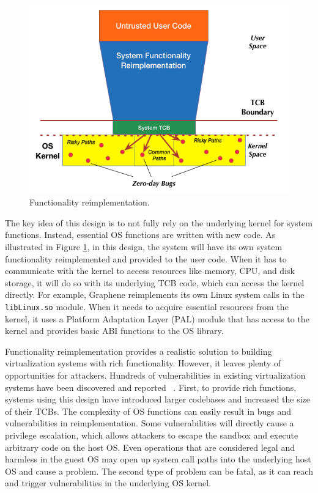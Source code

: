 \begin{figure}%
\centering
\includegraphics[width=1.0\columnwidth]{diagram/Virtualization_Design_Model_02.png}
\caption{\small Functionality reimplementation.}
\label{fig:design_functionality_reimplementation}
\end{figure}

The key idea of this design is to not fully rely on the underlying
kernel for system functions. Instead, essential OS functions are written with new
code. As illustrated in Figure \ref{fig:design_functionality_reimplementation},
in this design, the system will have its own system functionality reimplemented and
provided to the user code. When it has to communicate with the kernel
to access resources like memory, CPU, and disk storage, it will do so with
its underlying TCB code, which can access the kernel directly.
For example, Graphene \cite{Graphene-14} reimplements
its own Linux system calls in the
\texttt{libLinux.so} module. When it needs to acquire essential resources from
the kernel, it uses a
Platform Adaptation Layer (PAL)  module that has access to the kernel
and provides basic ABI functions to the OS library.

Functionality reimplementation provides a
realistic solution to building virtualization systems
with rich functionality. However, it
leaves plenty of opportunities for attackers. 
Hundreds of vulnerabilities in existing virtualization systems have been discovered and reported ~\cite{NVD}. 
First, to provide rich functions, systems using this design have
introduced larger codebases and increased the size of their TCBs.
The complexity of OS functions can easily result in bugs and vulnerabilities in
reimplementation. Some vulnerabilities
will directly cause a privilege escalation, which allows attackers to escape the sandbox
and execute arbitrary code on the host OS.
Even operations that are considered
legal and harmless in the guest OS may open up system call paths into the underlying
host OS and cause a problem.
The second type of problem can be fatal, as it can reach and
trigger vulnerabilities in the underlying OS kernel.

